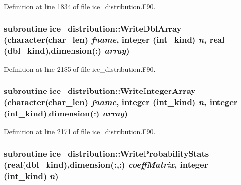Definition at line 1834 of file ice\_\-distribution.F90.\hypertarget{namespaceice__distribution_a273a42a83659ff86cfa8099c186ec503}{
\subsubsection[{WriteDblArray}]{\setlength{\rightskip}{0pt plus 5cm}subroutine ice\_\-distribution::WriteDblArray (character(char\_\-len) {\em fname}, \/  integer (int\_\-kind) {\em n}, \/  real (dbl\_\-kind),dimension(:) {\em array})}}
\label{namespaceice__distribution_a273a42a83659ff86cfa8099c186ec503}


Definition at line 2185 of file ice\_\-distribution.F90.\hypertarget{namespaceice__distribution_a671ab022211c1686b8fd0adf14d752b5}{
\subsubsection[{WriteIntegerArray}]{\setlength{\rightskip}{0pt plus 5cm}subroutine ice\_\-distribution::WriteIntegerArray (character(char\_\-len) {\em fname}, \/  integer (int\_\-kind) {\em n}, \/  integer (int\_\-kind),dimension(:) {\em array})}}
\label{namespaceice__distribution_a671ab022211c1686b8fd0adf14d752b5}


Definition at line 2171 of file ice\_\-distribution.F90.\hypertarget{namespaceice__distribution_afb1f8a57908d1a795f7976247cfd935c}{
\subsubsection[{WriteProbabilityStats}]{\setlength{\rightskip}{0pt plus 5cm}subroutine ice\_\-distribution::WriteProbabilityStats (real(dbl\_\-kind),dimension(:,:) {\em coeffMatrix}, \/  integer (int\_\-kind) {\em n})}}
\label{namespaceice__distribution_afb1f8a57908d1a795f7976247cfd935c}



